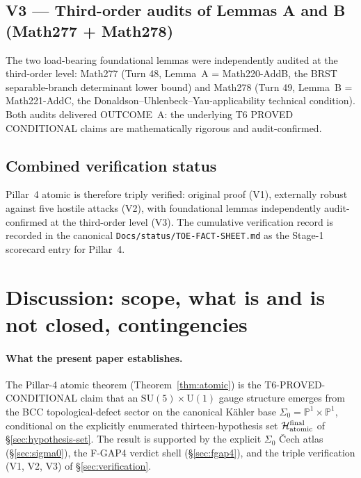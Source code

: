 \subsection{V3 — Third-order audits of Lemmas A and B (Math277 +
Math278)}

The two load-bearing foundational lemmas were independently
audited at the third-order level: Math277 (Turn 48, Lemma~A =
Math220-AddB, the BRST separable-branch determinant lower bound) and
Math278 (Turn 49, Lemma~B = Math221-AddC, the
Donaldson--Uhlenbeck--Yau-applicability technical condition). Both
audits delivered OUTCOME~A: the underlying T6 PROVED CONDITIONAL
claims are mathematically rigorous and audit-confirmed.

\subsection{Combined verification status}

Pillar~4 atomic is therefore triply verified: original proof (V1),
externally robust against five hostile attacks (V2), with
foundational lemmas independently audit-confirmed at the third-order
level (V3). The cumulative verification record is recorded in the
canonical \texttt{Docs/status/TOE-FACT-SHEET.md} as the Stage-1
scorecard entry for Pillar~4.

\section{Discussion: scope, what is and is not closed,
contingencies}\label{sec:discussion}

\paragraph{What the present paper establishes.}
The Pillar-4 atomic theorem (Theorem~\ref{thm:atomic}) is the
T6-PROVED-CONDITIONAL claim that an
$\mathrm{SU}(5) \times \mathrm{U}(1)$ gauge structure emerges from
the BCC topological-defect sector on the canonical Kähler base
$\Sigma_0 = \mathbb{P}^1 \times \mathbb{P}^1$, conditional on the
explicitly enumerated thirteen-hypothesis set
$\mathcal{H}_{\rm atomic}^{\rm final}$ of
\S\ref{sec:hypothesis-set}. The result is supported by the explicit
$\Sigma_0$ \v{C}ech atlas (\S\ref{sec:sigma0}), the
F-GAP4 verdict shell (\S\ref{sec:fgap4}), and the triple
verification (V1, V2, V3) of \S\ref{sec:verification}.


